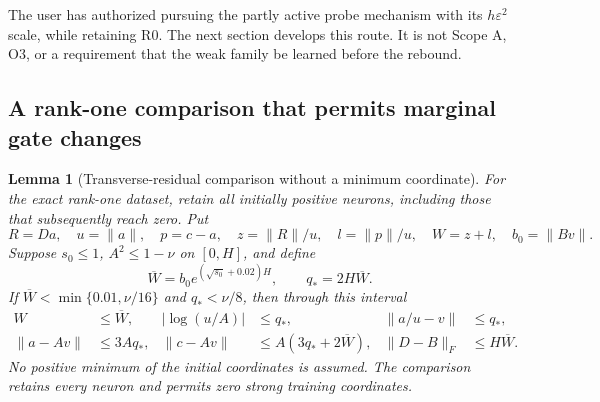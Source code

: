 \documentclass{article} %
\theoremstyle{plain}
\newtheorem{lemma}[theorem]{Lemma}
\theoremstyle{definition}
\theoremstyle{remark}
\begin{document}
The user has authorized pursuing the partly active probe mechanism with
its $h\varepsilon^2$ scale, while retaining R0. The next section develops
this route. It is not Scope A, O3, or a requirement that the weak family
be learned before the rebound.

\subsection{A rank-one comparison that permits marginal gate changes}

\begin{lemma}[Transverse-residual comparison without a minimum coordinate]
\label{sbquant:residual-comparison}
For the exact rank-one dataset, retain all initially positive neurons,
including those that subsequently reach zero. Put
\[
 R=Da,\quad u=\|a\|,\quad p=c-a,\quad
 z=\|R\|/u,\quad l=\|p\|/u,\quad W=z+l,
 \quad b_0=\|Bv\|.
\]
Suppose $s_0\le1$, $A^2\le1-\nu$ on $[0,H]$, and define
\[
 \overline W=b_0e^{(\sqrt{s_0}+0.02)H},\qquad
 q_*=2H\overline W.
\]
If $\overline W<\min\{0.01,\nu/16\}$ and $q_*<\nu/8$, then
through this interval
\begin{align}
 W&\le\overline W,&
 |\log(u/A)|&\le q_*,&
 \|a/u-v\|&\le q_*,\label{sbquant:residual-controls}\\
 \|a-Av\|&\le3Aq_*,&
 \|c-Av\|&\le A(3q_*+2\overline W),&
 \|D-B\|_F&\le H\overline W.\nonumber
\end{align}
No positive minimum of the initial coordinates is assumed. The comparison
retains every neuron and permits zero strong training coordinates.
\end{lemma}
\end{document}
